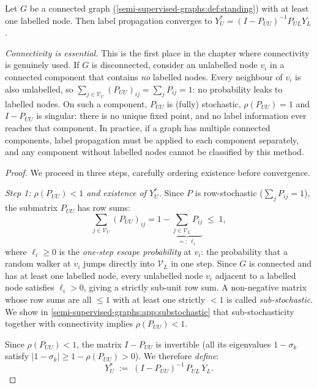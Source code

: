 \begin{notechapter}
\begin{theorem}
\label{semi-supervised-graphs:thm:lp_closed}
Let $G$ be a connected graph (\cref{semi-supervised-graphs:def:standing}) with at
least one labelled node. Then label propagation converges to
$Y_U^* = (I - P_{UU})^{-1}P_{UL}Y_L$.
\end{theorem}

\begin{pitfall}
\emph{Connectivity is essential.} This is the first place in the chapter
where connectivity is genuinely used. If $G$ is disconnected, consider an
unlabelled node $v_i$ in a connected component that contains \emph{no} labelled
nodes. Every neighbour of $v_i$ is also unlabelled, so
$\sum_{j \in \mathcal{V}_U}(P_{UU})_{ij} = \sum_j P_{ij} = 1$: no
probability leaks to labelled nodes. On such a component, $P_{UU}$ is
(fully) stochastic, $\rho(P_{UU}) = 1$ and $I - P_{UU}$ is singular: there is no
unique fixed point, and no label information ever reaches that component.
In practice, if a graph has multiple connected components, label propagation
must be applied to each component separately, and any component without
labelled nodes cannot be classified by this method.
\end{pitfall}

\begin{proof}
We proceed in three steps, carefully ordering existence before convergence.
\vspace{0.5em}

\emph{Step 1: $\rho(P_{UU}) < 1$ and existence of $Y_U^*$.}
Since $P$ is row-stochastic ($\sum_j P_{ij} = 1$), the submatrix $P_{UU}$ has
row sums:
\[
\sum_{j \in \mathcal{V}_U} (P_{UU})_{ij}
= 1 - \underbrace{\sum_{j \in \mathcal{V}_L} P_{ij}}_{=:\,\ell_i} \;\leq\; 1,
\]
where $\ell_i \geq 0$ is the \emph{one-step escape probability} at $v_i$:
the probability that a random walker at $v_i$ jumps directly into
$\mathcal{V}_L$ in one step. Since $G$ is connected and has at least one
labelled node, every unlabelled node $v_i$ adjacent to a labelled node satisfies
$\ell_i > 0$, giving a strictly sub-unit row sum. A non-negative matrix whose
row sums are all $\leq 1$ with at least one strictly $< 1$ is called
\emph{sub-stochastic}. We show in \cref{semi-supervised-graphs:app:substochastic} that
sub-stochasticity together with connectivity implies $\rho(P_{UU}) < 1$.

Since $\rho(P_{UU}) < 1$, the matrix $I - P_{UU}$ is invertible
(all its eigenvalues $1 - \sigma_k$ satisfy $|1-\sigma_k| \geq 1 - \rho(P_{UU})
> 0$). We therefore \emph{define}:
\[
  Y_U^* \;:=\; (I - P_{UU})^{-1}\,P_{UL}\,Y_L.
\]


\end{proof}
\end{notechapter}
